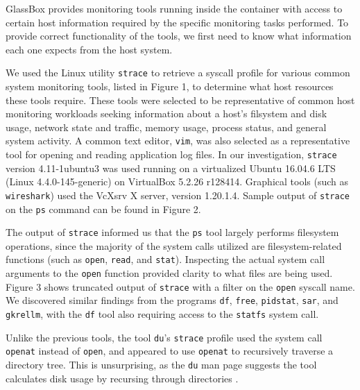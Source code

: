 \documentclass{proc}
\begin{document}
GlassBox provides monitoring tools running inside the container with access to certain host information required by the specific monitoring tasks performed. To provide correct functionality of the tools, we first need to know what information each one expects from the host system.

We used the Linux utility \texttt{strace} to retrieve a syscall profile for various common system monitoring tools, listed in Figure 1, to determine what host resources these tools require. These tools were selected to be representative of common host monitoring workloads seeking information about a host's filsystem and disk usage, network state and traffic, memory usage, process status, and general system activity. A common text editor, \texttt{vim}, was also selected as a representative tool for opening and reading application log files. In our investigation, \texttt{strace} version 4.11-1ubuntu3 was used running on a virtualized Ubuntu 16.04.6 LTS (Linux 4.4.0-145-generic) on VirtualBox 5.2.26 r128414. Graphical tools (such as \texttt{wireshark}) used the VcXsrv X server, version 1.20.1.4. Sample output of \texttt{strace} on the \texttt{ps} command can be found in Figure 2.

The output of \texttt{strace} informed us that the \texttt{ps} tool largely performs filesystem operations, since the majority of the system calls utilized are filesystem-related functions (such as \texttt{open}, \texttt{read}, and \texttt{stat}). Inspecting the actual system call arguments to the \texttt{open} function provided clarity to what files are being used. Figure 3 shows truncated output of \texttt{strace} with a filter on the \texttt{open} syscall name. We discovered similar findings from the programs \texttt{df}, \texttt{free}, \texttt{pidstat}, \texttt{sar}, and \texttt{gkrellm}, with the \texttt{df} tool also requiring access to the \texttt{statfs} system call.

Unlike the previous tools, the tool \texttt{du}'s \texttt{strace} profile used the system call \texttt{openat} instead of \texttt{open}, and appeared to use \texttt{openat} to recursively traverse a directory tree. This is unsurprising, as the \texttt{du} man page suggests the tool calculates disk usage by recursing through directories \cite{duman}.
\end{document}
